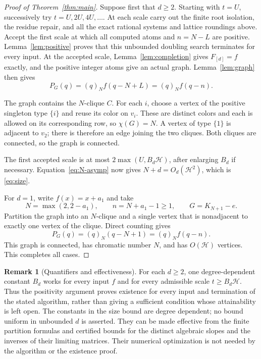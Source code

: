 \documentclass[11pt,a4paper]{article}
\theoremstyle{definition}
\newtheorem{remark}[theorem]{Remark}
\newcommand{\fall}[2]{(#1)_{#2}}
\newcommand{\htf}{\mathcal H}
\begin{document}
\begin{proof}[Proof of Theorem~\ref{thm:main}]
Suppose first that $d\ge2$. Starting with $t=U$, successively try
$t=U,2U,4U,\ldots$. At each scale carry out the finite root isolation,
the residue repair, and all the exact rational systems and lattice
roundings above. Accept the first scale at which all computed atoms
and $n=N-L$ are positive. Lemma~\ref{lem:positive} proves that this
unbounded doubling search terminates for every input. At the accepted
scale, Lemma~\ref{lem:completion} gives $F_{[d]}=f$ exactly, and the
positive integer atoms give an actual graph. Lemma~\ref{lem:graph}
then gives
\[
 P_G(q)=\fall qN f(q-N+L)=\fall qN f(q-n).
\]

The graph contains the $N$-clique $C$. For each $i$, choose a vertex of
the positive singleton type $\{i\}$ and reuse its color on $v_i$.
These are distinct colors and each is allowed on its corresponding
row, so $\chi(G)=N$. A vertex of type $\{1\}$ is adjacent to $v_2$;
there is therefore an edge joining the two cliques. Both cliques are
connected, so the graph is connected.

The first accepted scale is at most
$2\max(U,B_d\htf)$, after enlarging $B_d$ if necessary.
Equation~\eqref{eq:N-asymp} now gives
$N+d=O_d(\htf^2)$, which is \eqref{eq:size}.

For $d=1$, write $f(x)=x+a_1$ and take
\[
 N=\max(2,2-a_1),\qquad n=N+a_1-1\ge1,\qquad
 G=K_{N+1}-e.
\]
Partition the graph into an $N$-clique and a single vertex that is
nonadjacent to exactly one vertex of the clique. Direct counting gives
\[
 P_G(q)=\fall qN(q-N+1)=\fall qN f(q-n).
\]
This graph is connected, has chromatic number $N$, and has
$O(\htf)$ vertices. This completes all cases.
\end{proof}

\begin{remark}[Quantifiers and effectiveness]\label{rem:quantifiers}
For each $d\ge2$, one degree-dependent constant $B_d$ works for every
input $f$ and for every admissible scale $t\ge B_d\htf$.
Thus the positivity argument proves existence
for every input and termination of the stated algorithm, rather than
giving a sufficient condition whose attainability is left open.
The constants in the size bound are degree dependent; no bound uniform
in unbounded $d$ is asserted. They can be made effective from the finite
partition formulas and certified bounds for the distinct algebraic
slopes and the inverses of their limiting matrices. Their numerical
optimization is not needed by the algorithm or the existence proof.
\end{remark}
\end{document}
